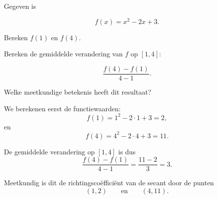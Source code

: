 \documentclass{ximera}
\begin{document}
\begin{oefening}{\oefB\ESS}

Gegeven is

\[
f(x)=x^2-2x+3.
\]

\begin{question}
Bereken $f(1)$ en $f(4)$.
\end{question}

\begin{question}
Bereken de gemiddelde verandering van $f$ op $[1,4]$:

\[
\frac{f(4)-f(1)}{4-1}.
\]
\end{question}

\begin{question}
Welke meetkundige betekenis heeft dit resultaat?

\begin{multipleChoice}
\end{multipleChoice}
\end{question}

\begin{oplossing}

We berekenen eerst de functiewaarden:
\[
f(1)=1^2-2\cdot1+3=2,
\]
en
\[
f(4)=4^2-2\cdot4+3=11.
\]

De gemiddelde verandering op $[1,4]$ is dus
\[
\frac{f(4)-f(1)}{4-1}
=
\frac{11-2}{3}
=
3.
\]

Meetkundig is dit de richtingscoëfficiënt van de secant door de punten
\[
(1,2)
\qquad\text{en}\qquad
(4,11).
\]

\end{oplossing}

\end{oefening}


\end{document}
